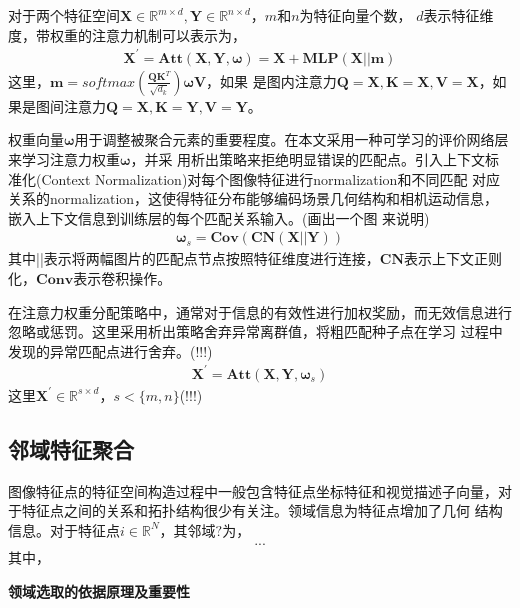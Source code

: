 \documentclass[10pt]{article}
\begin{document}
对于两个特征空间$\mathbf{X}\in \mathbb{R}^{m \times d},\mathbf{Y}\in \mathbb{R}^{n \times d}$，$m$和$n$为特征向量个数，
$d$表示特征维度，带权重的注意力机制可以表示为，
\begin{align} 
    \mathbf{X}^{'} = \mathbf{Att}(\mathbf{X},\mathbf{Y},\mathbf{\omega})=\mathbf{X}+\mathbf{MLP}(\mathbf{X}||\mathbf{m})
\end{align}
这里，$\mathbf{m}=softmax(\frac{\mathbf{Q}\mathbf{K}^T}{\sqrt{d_k}})\mathbf{\omega}\mathbf{V}$\cite{Vaswani2017}，如果
是图内注意力$\mathbf{Q}=\mathbf{X},\mathbf{K}=\mathbf{X},\mathbf{V}=\mathbf{X}$，如果是图间注意力$\mathbf{Q}=\mathbf{X},
\mathbf{K}=\mathbf{Y},\mathbf{V}=\mathbf{Y}$。

权重向量$\mathbf{\omega}$用于调整被聚合元素的重要程度。在本文采用一种可学习的评价网络层来学习注意力权重$\mathbf{\omega}$，并采
用析出策略来拒绝明显错误的匹配点。引入上下文标准化(Context Normalization)\cite{Yi2017}对每个图像特征进行normalization和不同匹配
对应关系的normalization，这使得特征分布能够编码场景几何结构和相机运动信息，嵌入上下文信息到训练层的每个匹配关系输入。(画出一个图
来说明)
\begin{align} 
    \mathbf{\omega}_{s}=\mathbf{Cov}(\mathbf{CN}(\mathbf{X}||\mathbf{Y}))
\end{align}
其中||表示将两幅图片的匹配点节点按照特征维度进行连接，$\mathbf{CN}$表示上下文正则化，$\mathbf{Conv}$表示卷积操作。 

在注意力权重分配策略中，通常对于信息的有效性进行加权奖励，而无效信息进行忽略或惩罚。这里采用析出策略舍弃异常离群值，将粗匹配种子点在学习
过程中发现的异常匹配点进行舍弃。(!!!)
\begin{align}
    \mathbf{X}^{'}=\mathbf{Att}(\mathbf{X}, \mathbf{Y}, \mathbf{\omega}_{s})
\end{align}
这里$\mathbf{X}^{'}\in \mathbb{R}^{s \times d}$，$s<\{m,n\}$(!!!)
\subsection{邻域特征聚合}
图像特征点的特征空间构造过程中一般包含特征点坐标特征和视觉描述子向量，对于特征点之间的关系和拓扑结构很少有关注。领域信息为特征点增加了几何
结构信息。对于特征点$i \in \mathbb{R}^{N}$，其邻域$?$为，
\begin{align}
    ... 
\end{align}
其中，

\textbf{领域选取的依据原理及重要性}


    
\end{document}
